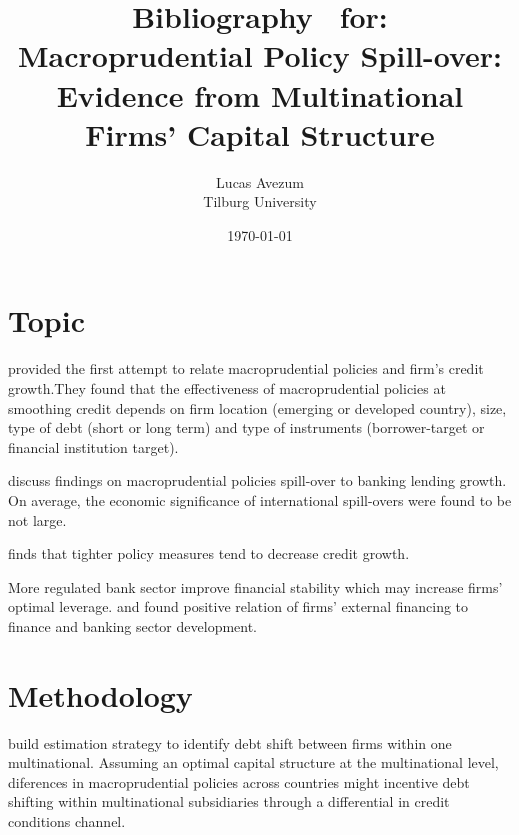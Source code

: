 \documentclass[12pt,runningheads]{article}
\begin{document}
\title{Bibliography \ for:\\ \textbf{
   Macroprudential Policy Spill-over: Evidence from Multinational Firms' Capital Structure \large}} 


\author{Lucas Avezum \\
Tilburg University \vspace*{20pt}}
\date{\today }

\maketitle
\section{Topic}
\cite*{ayyagari2017credit} provided the first attempt to relate macroprudential policies and firm's credit growth.They found that the effectiveness of macroprudential policies at smoothing credit depends on firm location (emerging or developed country), size, type of debt (short or long term) and type of instruments (borrower-target or financial institution target).

\cite*{buch2017international} discuss findings on macroprudential policies spill-over to banking lending growth. On average, the economic significance of international spill-overs were found to be not large.

\cite*{jimenez2012macroprudential} finds that tighter policy measures tend to decrease credit growth.

 More regulated bank sector improve financial stability which may increase firms' optimal leverage. \cite*{beck2004bank} and \cite{demirgucc1998law} found positive relation of firms' external financing to finance and banking sector development.
 
\section{Methodology}
\cite*{huizinga2008capital} build estimation strategy to identify debt shift between firms within one multinational. Assuming an optimal capital structure at the multinational level, diferences in macroprudential policies across countries might incentive debt shifting within multinational subsidiaries through a differential in credit conditions channel.




\end{document}
